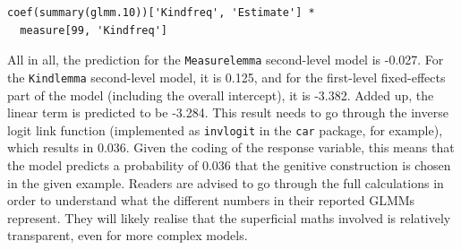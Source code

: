 \vspace{0.5\baselineskip}

\begin{lstlisting}
coef(summary(glmm.10))['Kindfreq', 'Estimate'] *
  measure[99, 'Kindfreq']
\end{lstlisting}

All in all, the prediction for the \texttt{Measurelemma} second-level model is -0.027.
For the \texttt{Kindlemma} second-level model, it is 0.125, and for the first-level fixed-effects part of the model (including the overall intercept), it is -3.382.
Added up, the linear term is predicted to be -3.284.
This result needs to go through the inverse logit link function (implemented as \texttt{invlogit} in the \texttt{car} package, for example), which results in 0.036.
Given the coding of the response variable, this means that the model predicts a probability of 0.036 that the genitive construction is chosen in the given example.
Readers are advised to go through the full calculations in order to understand what the different numbers in their reported GLMMs represent.
They will likely realise that the superficial maths involved is relatively transparent, even for more complex models.
